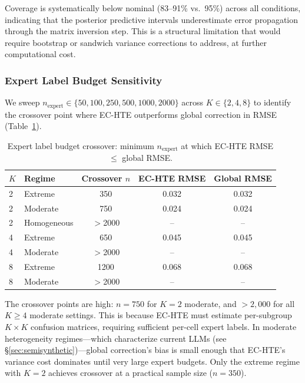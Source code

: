 \documentclass[11pt,a4paper]{article}
\begin{document}
Coverage is systematically below nominal (83--91\% vs.\ 95\%) across all conditions, indicating that the posterior predictive intervals underestimate error propagation through the matrix inversion step. This is a structural limitation that would require bootstrap or sandwich variance corrections to address, at further computational cost.

\subsubsection{Expert Label Budget Sensitivity}

We sweep $n_{\text{expert}} \in \{50, 100, 250, 500, 1000, 2000\}$ across $K \in \{2, 4, 8\}$ to identify the crossover point where EC-HTE outperforms global correction in RMSE (Table~\ref{tab:budget}).

\begin{table}[t]
\centering
\caption{Expert label budget crossover: minimum $n_{\text{expert}}$ at which EC-HTE RMSE $\leq$ global RMSE.}
\label{tab:budget}
\begin{tabular}{@{}llccc@{}}
\toprule
$K$ & Regime & Crossover $n$ & EC-HTE RMSE & Global RMSE \\
\midrule
2 & Extreme     & 350    & 0.032 & 0.032 \\
2 & Moderate    & 750    & 0.024 & 0.024 \\
2 & Homogeneous & $>$2000 & --    & --    \\
4 & Extreme     & 650    & 0.045 & 0.045 \\
4 & Moderate    & $>$2000 & --    & --    \\
8 & Extreme     & 1200   & 0.068 & 0.068 \\
8 & Moderate    & $>$2000 & --    & --    \\
\bottomrule
\end{tabular}
\end{table}

The crossover points are high: $n{=}750$ for $K{=}2$ moderate, and $>2{,}000$ for all $K{\geq}4$ moderate settings. This is because EC-HTE must estimate per-subgroup $K \times K$ confusion matrices, requiring sufficient per-cell expert labels. In moderate heterogeneity regimes---which characterize current LLMs (see \S\ref{sec:semisynthetic})---global correction's bias is small enough that EC-HTE's variance cost dominates until very large expert budgets. Only the extreme regime with $K{=}2$ achieves crossover at a practical sample size ($n{=}350$).
\end{document}
